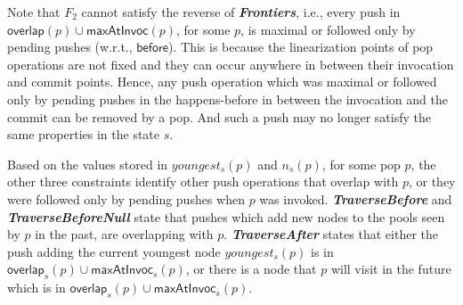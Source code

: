 
Note that $F_2$ cannot satisfy the reverse of {\bf \emph{Frontiers}}, i.e., every push in $\mathsf{overlap}(p) \cup \mathsf{maxAtInvoc}(p)$, for some $p$, is maximal or followed only by pending pushes (w.r.t., $\mathsf{before}$). This is because 
the linearization points of pop operations are not fixed and they can occur anywhere in between their invocation and commit points. Hence, any push operation which was maximal or followed only by pending pushes in the happens-before 
in between the invocation and the commit 
can be removed by a pop. And such a push may no longer satisfy the same properties in the state $s$. 

Based on the values stored in $youngest_s(p)$ and $n_s(p)$, for some pop $p$, %
the other three constraints identify other push operations that overlap with $p$, or they were followed only by pending pushes when $p$ was invoked. 
{\bf \emph{TraverseBefore}} and {\bf \emph{TraverseBeforeNull}} state that pushes which add new nodes to the pools seen by $p$ in the past,  are overlapping with $p$. {\bf \emph{TraverseAfter}} states that either the push adding the current youngest node $youngest_s(p)$ is in $\mathsf{overlap}_s(p) \cup \mathsf{maxAtInvoc}_s(p)$, or there is a node that $p$ will visit in the future which is in $\mathsf{overlap}_s(p) \cup \mathsf{maxAtInvoc}_s(p)$. 

